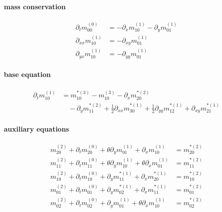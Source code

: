 \documentclass{article}
\begin{document}
  \paragraph{mass conservation}
  \begin{align}
    \partial_t m_{00}^{(0)}  & =  - \partial_x m_{10}^{(1)} - \partial_y m_{01}^{(1)}\tag{M1} \\
    \partial_{xx} m_{10}^{(1)}  & = - \partial_{xy} m_{01}^{(1)} \tag{M2}\\
    \partial_{yx} m_{10}^{(1)}  & = - \partial_{yy} m_{01}^{(1)} \tag{M3}
  \end{align}

  \paragraph{base equation}
  \begin{equation}
    \tag{B1}
    \begin{aligned}
       \partial_t m_{10}^{(1)} & =
      m_{10}^{*(3)} - m_{10}^{(3)} - \partial_x m_{20}^{*(2)} \\
      &\quad - \partial_y m_{11}^{*(2)} + \frac{1}{2}\partial_{xx} m_{30}^{*(1)} + \frac{1}{2} \partial_{yy} m_{12}^{*(1)} + \partial_{xy} m_{21}^{*(1)}
    \end{aligned}
  \end{equation}

  \paragraph{auxiliary equations}
  \begin{align}
    m_{20}^{(2)} + \partial_t m_{20}^{(0)} + \theta\partial_y m_{01}^{(1)} + \partial_x m_{10}^{(1)} &= m_{20}^{*(2)} \tag{A1} \\
    m_{11}^{(2)} + \partial_t m_{11}^{(0)} + \theta\partial_y m_{10}^{(1)} + \theta\partial_x m_{01}^{(1)} &= m_{11}^{*(2)} \tag{A2} \\
    m_{10}^{(2)} + \partial_t m_{10}^{(0)} + \partial_y m_{11}^{*(1)} + \partial_x m_{20}^{*(1)} &= m_{10}^{*(2)} \tag{A3} \\
    m_{01}^{(2)} + \partial_t m_{01}^{(0)} + \partial_y m_{02}^{*(1)} + \partial_x m_{11}^{*(1)} &= m_{01}^{*(2)} \tag{A4} \\
    m_{02}^{(2)} + \partial_t m_{02}^{(0)} + \partial_y m_{01}^{(1)} + \theta\partial_x m_{10}^{(1)} &= m_{02}^{*(2)} \tag{A5}
  \end{align}
\end{document}
